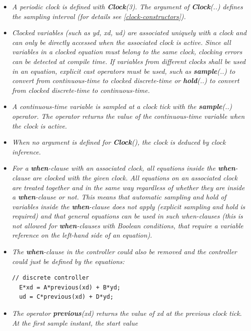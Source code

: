 \documentclass[10pt,a4paper]{report}
\begin{document}
\begin{itemize}
\item
  \emph{A periodic clock is defined with \textbf{Clock}(3). The argument
  of \textbf{Clock}(..) defines the sampling interval (for details see \ref{clock-constructors}).}
\item
  \emph{Clocked variables (such as yd, xd, ud) are associated uniquely
  with a clock and can only be directly accessed when the associated
  clock is active. Since all variables in a clocked equation must belong
  to the same clock, clocking errors can be detected at compile time. If
  variables from different clocks shall be used in an equation, explicit
  cast operators must be used, such as \textbf{sample}(..) to convert
  from continuous-time to clocked discrete-time or \textbf{hold}(..) to
  convert from clocked discrete-time to continuous-time.}
\item
  \emph{A continuous-time variable is sampled at a clock tick with the
  \textbf{sample}(..) operator. The operator returns the value of the
  continuous-time variable when the clock is active.}
\item
  \emph{When no argument is defined for \textbf{Clock}(), the clock is
  deduced by clock inference.}
\item
  \emph{For a \textbf{when}-clause with an associated clock, all
  equations inside the \textbf{when}-clause are clocked with the given
  clock. All equations on an associated clock are treated together and
  in the same way regardless of whether they are inside a
  \textbf{when}-clause or not. This means that automatic sampling and
  hold of variables inside the \textbf{when}-clause does not apply
  (explicit sampling and hold is required) and that general equations
  can be used in such when-clauses (this is not allowed for
  \textbf{when}-clauses with Boolean conditions, that require a variable
  reference on the left-hand side of an equation).}
\item
  \emph{The \textbf{when}-clause in the controller could also be removed
  and the controller could just be defined by the equations:\\}
\begin{lstlisting}[language=modelica]
  // discrete controller
  E*xd = A*previous(xd) + B*yd;
  ud = C*previous(xd) + D*yd; 
\end{lstlisting}
\item
  \emph{The operator \textbf{previous}(xd) returns the value of xd at
  the previous clock tick. At the first sample instant, the start value
}
\end{itemize}
\end{document}
